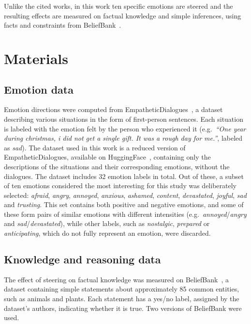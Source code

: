\documentclass{article}
\begin{document}
Unlike the cited works, in this work ten specific emotions are steered and the resulting effects are measured on factual knowledge and simple inferences, using facts and constraints from BeliefBank~\cite{kassner2021beliefbank}.

\section{Materials}

\subsection{Emotion data}
Emotion directions were computed from EmpatheticDialogues~\cite{rashkin2019empathetic}, a dataset describing various situations in the form of first-person sentences. Each situation is labeled with the emotion felt by the person who experienced it (e.g.\ \textit{``One year during christmas, i did not get a single gift. It was a rough day for me.''}, labeled as \textit{sad}). The dataset used in this work is a reduced version of EmpatheticDialogues, available on HuggingFace~\cite{bdotloh2023edcontexts}, containing only the descriptions of the situations and their corresponding emotions, without the dialogues. The dataset includes 32 emotion labels in total. Out of these, a subset of ten emotions considered the most interesting for this study was deliberately selected: \textit{afraid}, \textit{angry}, \textit{annoyed}, \textit{anxious}, \textit{ashamed}, \textit{content}, \textit{devastated}, \textit{joyful}, \textit{sad} and \textit{trusting}. This set contains both positive and negative emotions, and some of these form pairs of similar emotions with different intensities (e.g.\ \textit{annoyed}/\textit{angry} and \textit{sad}/\textit{devastated}), while other labels, such as \textit{nostalgic}, \textit{prepared} or \textit{anticipating}, which do not fully represent an emotion, were discarded.

\subsection{Knowledge and reasoning data}
\label{sec:materials_knowledge}
The effect of steering on factual knowledge was measured on BeliefBank~\cite{kassner2021beliefbank}, a dataset containing simple statements about approximately 85 common entities, such as animals and plants. Each statement has a yes/no label, assigned by the dataset's authors, indicating whether it is true. Two versions of BeliefBank were used.
\end{document}
